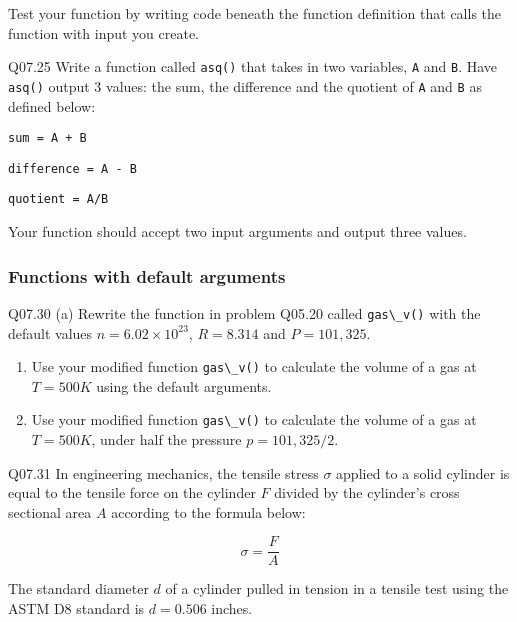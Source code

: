 \documentclass{book}
\newcommand{\passthrough}[1]{#1}
\begin{document}
Test your function by writing code beneath the function definition that
calls the function with input you create.

Q07.25 Write a function called \passthrough{\lstinline!asq()!} that
takes in two variables, \passthrough{\lstinline!A!} and
\passthrough{\lstinline!B!}. Have \passthrough{\lstinline!asq()!} output
3 values: the sum, the difference and the quotient of
\passthrough{\lstinline!A!} and \passthrough{\lstinline!B!} as defined
below:

\passthrough{\lstinline!sum = A + B!}

\passthrough{\lstinline!difference = A - B!}

\passthrough{\lstinline!quotient = A/B!}

Your function should accept two input arguments and output three values.
    




    
        \hypertarget{functions-with-default-arguments}{%
\subsubsection{Functions with default
arguments}\label{functions-with-default-arguments}}

Q07.30 (a) Rewrite the function in problem Q05.20 called
\passthrough{\lstinline!gas\_v()!} with the default values
\(n = 6.02 \times 10^{23}\), \(R = 8.314\) and \(P = 101,325\).

\begin{enumerate}
\def\labelenumi{(\alph{enumi})}
\item
  Use your modified function \passthrough{\lstinline!gas\_v()!} to
  calculate the volume of a gas at \(T = 500 K\) using the default
  arguments.
\item
  Use your modified function \passthrough{\lstinline!gas\_v()!} to
  calculate the volume of a gas at \(T = 500K\), under half the pressure
  \(p = 101,325/2\).
\end{enumerate}

Q07.31 In engineering mechanics, the tensile stress \(\sigma\) applied
to a solid cylinder is equal to the tensile force on the cylinder \(F\)
divided by the cylinder's cross sectional area \(A\) according to the
formula below:

\[ \sigma = \frac{F}{A} \]

The standard diameter \(d\) of a cylinder pulled in tension in a tensile
test using the ASTM D8 standard is \(d=0.506\) inches.
\end{document}
